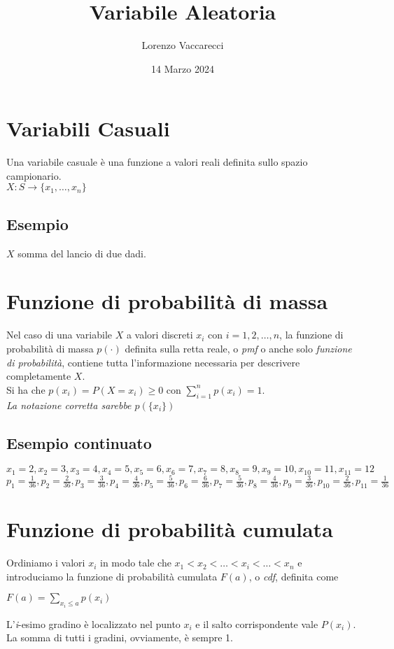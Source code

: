 \documentclass[12pt]{article}
\title{Variabile Aleatoria}
\author{Lorenzo Vaccarecci}
\date{14 Marzo 2024}
\begin{document}
\maketitle
\section{Variabili Casuali}
Una variabile casuale è una funzione a valori reali definita sullo spazio campionario.\\
\(X: S \rightarrow \{x_{1}, \dots, x_{n}\}\)
\subsection{Esempio}
$X$ somma del lancio di due dadi.
\section{Funzione di probabilità di massa}
Nel caso di una variabile $X$ a valori discreti $x_{i}$ con $i=1,2,\dots,n$, la funzione di probabilità di massa $p(\cdot)$ definita sulla retta reale, o \textit{pmf} o anche solo \textit{funzione di probabilità}, contiene tutta l'informazione necessaria per descrivere completamente $X$.\\ Si ha che \(p(x_{i})=P(X=x_{i})\geq 0 \text{ con } \sum_{i=1}^{n}p(x_{i})=1\).\\
\textit{La notazione corretta sarebbe $p(\{x_{i}\})$}
\subsection{Esempio continuato}
\(x_{1}=2,x_{2}=3,x_{3}=4,x_{4}=5,x_{5}=6,x_{6}=7,x_{7}=8,x_{8}=9,x_{9}=10,x_{10}=11,x_{11}=12\)\\
\(p_{1}=\frac{1}{36},p_{2}=\frac{2}{36},p_{3}=\frac{3}{36},p_{4}=\frac{4}{36},p_{5}=\frac{5}{36},p_{6}=\frac{6}{36},p_{7}=\frac{5}{36},p_{8}=\frac{4}{36},p_{9}=\frac{3}{36},p_{10}=\frac{2}{36},p_{11}=\frac{1}{36}\)
\section{Funzione di probabilità cumulata}
Ordiniamo i valori $x_{i}$ in modo tale che $x_{1}<x_{2}<\dots<x_{i}<\dots<x_{n}$ e introduciamo la funzione di probabilità cumulata $F(a)$, o \textit{cdf}, definita come
\begin{center}
    \(F(a)=\sum_{x_{i}\leq a}p(x_{i})\)
\end{center}
\begin{center}
\end{center}
L'\textit{i}-esimo gradino è localizzato nel punto $x_{i}$ e il salto corrispondente vale $P(x_{i})$. La somma di tutti i gradini, ovviamente, è sempre 1.
\end{document}
